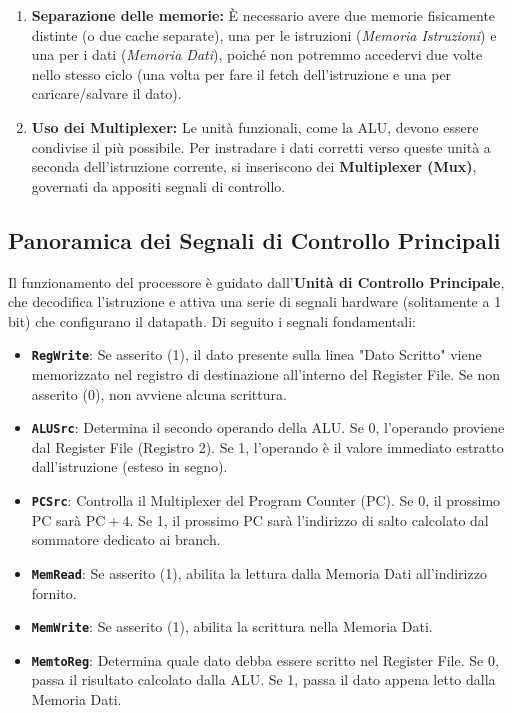 \documentclass[12pt, a4paper]{article}
\begin{document}
\begin{enumerate}
    \item \textbf{Separazione delle memorie:} È necessario avere due memorie fisicamente distinte (o due cache separate), una per le istruzioni (\textit{Memoria Istruzioni}) e una per i dati (\textit{Memoria Dati}), poiché non potremmo accedervi due volte nello stesso ciclo (una volta per fare il fetch dell'istruzione e una per caricare/salvare il dato).
    \item \textbf{Uso dei Multiplexer:} Le unità funzionali, come la ALU, devono essere condivise il più possibile. Per instradare i dati corretti verso queste unità a seconda dell'istruzione corrente, si inseriscono dei \textbf{Multiplexer (Mux)}, governati da appositi segnali di controllo.
\end{enumerate}

\subsection{Panoramica dei Segnali di Controllo Principali}
Il funzionamento del processore è guidato dall'\textbf{Unità di Controllo Principale}, che decodifica l'istruzione e attiva una serie di segnali hardware (solitamente a 1 bit) che configurano il datapath. Di seguito i segnali fondamentali:

\begin{itemize}
    \item \texttt{\textbf{RegWrite}}: Se asserito (1), il dato presente sulla linea "Dato Scritto" viene memorizzato nel registro di destinazione all'interno del Register File. Se non asserito (0), non avviene alcuna scrittura.
    \item \texttt{\textbf{ALUSrc}}: Determina il secondo operando della ALU. Se 0, l'operando proviene dal Register File (Registro 2). Se 1, l'operando è il valore immediato estratto dall'istruzione (esteso in segno).
    \item \texttt{\textbf{PCSrc}}: Controlla il Multiplexer del Program Counter (PC). Se 0, il prossimo PC sarà $\text{PC} + 4$. Se 1, il prossimo PC sarà l'indirizzo di salto calcolato dal sommatore dedicato ai branch.
    \item \texttt{\textbf{MemRead}}: Se asserito (1), abilita la lettura dalla Memoria Dati all'indirizzo fornito.
    \item \textbf{\texttt{MemWrite}}: Se asserito (1), abilita la scrittura nella Memoria Dati.
    \item \textbf{\texttt{MemtoReg}}: Determina quale dato debba essere scritto nel Register File. Se 0, passa il risultato calcolato dalla ALU. Se 1, passa il dato appena letto dalla Memoria Dati.
\end{itemize}
\end{document}
